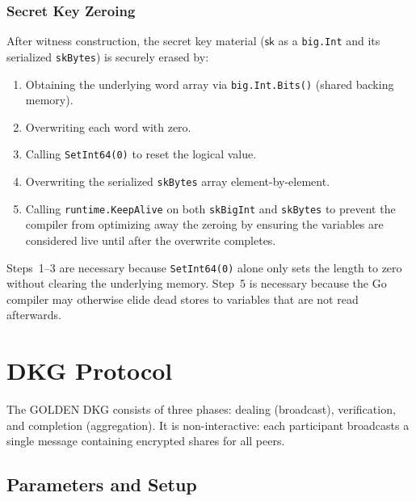 \documentclass[11pt,a4paper]{article}
\newcommand{\sk}{\mathsf{sk}}
\begin{document}
\subsubsection{Secret Key Zeroing}

After witness construction, the secret key material ($\sk$ as a
\texttt{big.Int} and its serialized \texttt{skBytes}) is securely erased by:
\begin{enumerate}[nosep]
  \item Obtaining the underlying word array via \texttt{big.Int.Bits()} (shared
    backing memory).
  \item Overwriting each word with zero.
  \item Calling \texttt{SetInt64(0)} to reset the logical value.
  \item Overwriting the serialized \texttt{skBytes} array element-by-element.
  \item Calling \texttt{runtime.KeepAlive} on both \texttt{skBigInt} and
    \texttt{skBytes} to prevent the compiler from optimizing away the zeroing
    by ensuring the variables are considered live until after the overwrite
    completes.
\end{enumerate}
Steps~1--3 are necessary because \texttt{SetInt64(0)} alone only sets the
length to zero without clearing the underlying memory. Step~5 is necessary
because the Go compiler may otherwise elide dead stores to variables that are
not read afterwards.

\section{DKG Protocol}
\label{sec:dkg}

The GOLDEN DKG consists of three phases: dealing (broadcast), verification, and
completion (aggregation). It is non-interactive: each participant broadcasts a
single message containing encrypted shares for all peers.

\subsection{Parameters and Setup}
\label{sec:dkg-setup}
\end{document}
